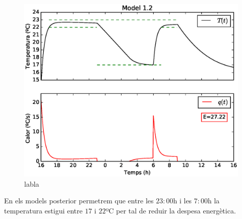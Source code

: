 \documentclass[11pt]{article}
\begin{document}
	\begin{figure}[h!]
		\centering
		\includegraphics[width=12cm]{model12.eps}
		\caption{labla}
		\label{figmodel12}
	\end{figure}
	En els models posterior permetrem que entre les $23:00$h i les $7:00$h la temperatura estigui entre $17$ i $22$ºC per tal de reduir la despesa energètica.
\end{document}
